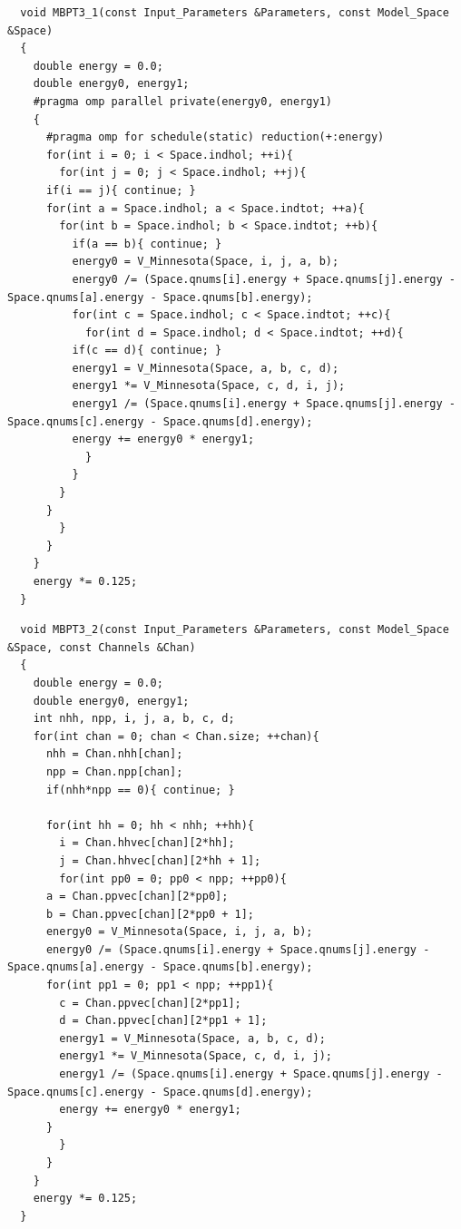 \begin{lstlisting}
  void MBPT3_1(const Input_Parameters &Parameters, const Model_Space &Space)
  {
    double energy = 0.0;
    double energy0, energy1;
    #pragma omp parallel private(energy0, energy1)
    {
      #pragma omp for schedule(static) reduction(+:energy)
      for(int i = 0; i < Space.indhol; ++i){
        for(int j = 0; j < Space.indhol; ++j){
	  if(i == j){ continue; }
	  for(int a = Space.indhol; a < Space.indtot; ++a){
	    for(int b = Space.indhol; b < Space.indtot; ++b){
	      if(a == b){ continue; }
	      energy0 = V_Minnesota(Space, i, j, a, b);
	      energy0 /= (Space.qnums[i].energy + Space.qnums[j].energy - Space.qnums[a].energy - Space.qnums[b].energy);
	      for(int c = Space.indhol; c < Space.indtot; ++c){
	        for(int d = Space.indhol; d < Space.indtot; ++d){
		  if(c == d){ continue; }
		  energy1 = V_Minnesota(Space, a, b, c, d);
		  energy1 *= V_Minnesota(Space, c, d, i, j);
		  energy1 /= (Space.qnums[i].energy + Space.qnums[j].energy - Space.qnums[c].energy - Space.qnums[d].energy);
		  energy += energy0 * energy1;
	        }
	      }
	    }
	  }
        }
      }
    }
    energy *= 0.125;
  }
\end{lstlisting}

\begin{lstlisting}
  void MBPT3_2(const Input_Parameters &Parameters, const Model_Space &Space, const Channels &Chan)
  {
    double energy = 0.0;
    double energy0, energy1;
    int nhh, npp, i, j, a, b, c, d;
    for(int chan = 0; chan < Chan.size; ++chan){
      nhh = Chan.nhh[chan];
      npp = Chan.npp[chan];
      if(nhh*npp == 0){ continue; }
      
      for(int hh = 0; hh < nhh; ++hh){
        i = Chan.hhvec[chan][2*hh];
        j = Chan.hhvec[chan][2*hh + 1];
        for(int pp0 = 0; pp0 < npp; ++pp0){
	  a = Chan.ppvec[chan][2*pp0];
	  b = Chan.ppvec[chan][2*pp0 + 1];
	  energy0 = V_Minnesota(Space, i, j, a, b);
	  energy0 /= (Space.qnums[i].energy + Space.qnums[j].energy - Space.qnums[a].energy - Space.qnums[b].energy);
	  for(int pp1 = 0; pp1 < npp; ++pp1){
	    c = Chan.ppvec[chan][2*pp1];
	    d = Chan.ppvec[chan][2*pp1 + 1];
	    energy1 = V_Minnesota(Space, a, b, c, d);
	    energy1 *= V_Minnesota(Space, c, d, i, j);
	    energy1 /= (Space.qnums[i].energy + Space.qnums[j].energy - Space.qnums[c].energy - Space.qnums[d].energy);
	    energy += energy0 * energy1;
	  }
        }
      }
    }
    energy *= 0.125;
  }
\end{lstlisting}

